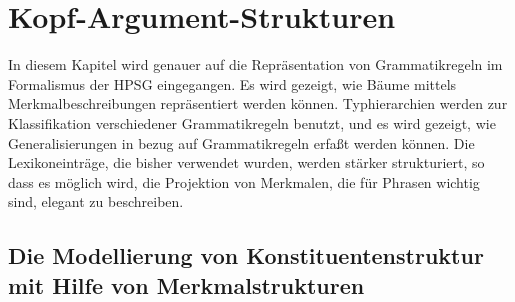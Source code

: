 

\chapter{Kopf-Argument-Strukturen}
\label{chap-komplementation}

In diesem Kapitel wird genauer auf die Repräsentation von Grammatikregeln
im Formalismus der HPSG eingegangen. Es wird gezeigt, wie Bäume mittels Merkmalbeschreibungen
repräsentiert werden können. Typhierarchien werden zur Klassifikation verschiedener
Grammatikregeln benutzt, und es wird gezeigt, wie Generalisierungen in bezug
auf Grammatikregeln erfaßt werden können. Die Lexikoneinträge, die bisher verwendet wurden,
werden stärker strukturiert, so dass es möglich wird, die Projektion
von Merkmalen, die für Phrasen wichtig sind, elegant zu beschreiben. 

\section{Die Modellierung von Konstituentenstruktur mit Hilfe von Merkmalstrukturen}

